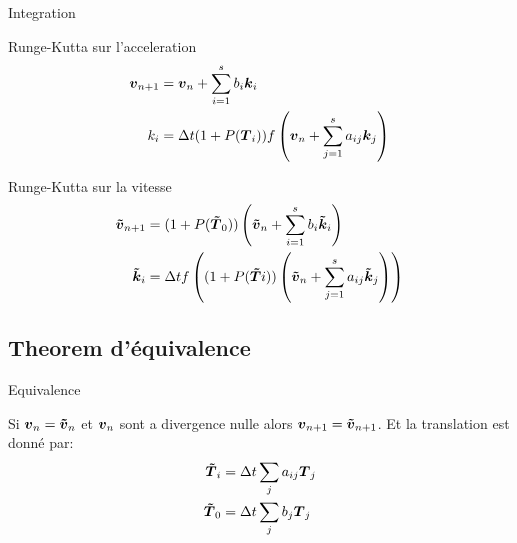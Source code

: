 \begin{frame}{Integration}
 \begin{block}{Runge-Kutta sur l'acceleration}
   \begin{align*}
	{\boldsymbol {v}}_{n+1}&={\boldsymbol {v}}_{n}+\sum_{i=1}^{s}b_{i}{\boldsymbol {k}}_{i}\\
	k_{i}&=\Delta t (1+P({\boldsymbol {T}}_{i}))f\left({\boldsymbol {v}}_{n}+\sum_{j=1}^{s}a_{ij}{\boldsymbol {k}}_{j}\right)
\end{align*}
 \end{block}
 
  \begin{block}{Runge-Kutta sur la vitesse}
   \begin{align*}
{\boldsymbol {\tilde{v}}}_{n+1}&=(1+P({\boldsymbol {\tilde{T}}}_0))\left({\boldsymbol {\tilde{v}}}_{n}+\sum_{i=1}^{s}b_{i}{\boldsymbol {\tilde{k}}}_{i}\right)\\
{\boldsymbol {\tilde{k}}}_{i}&=\Delta t f\left((1+P({\boldsymbol {\tilde{T}}}{i}))\left({\boldsymbol {\tilde{v}}}_{n}+\sum_{j=1}^{s}a_{ij}{\boldsymbol {\tilde{k}}}_{j}\right)\right)
\end{align*}
 \end{block}
\end{frame}
\subsection{Theorem d'équivalence}
\begin{frame}{Equivalence}
 \begin{theorem}
Si ${\boldsymbol {v}}_{n}={\boldsymbol {\tilde{v}}}_{n}$ et ${\boldsymbol {v}}_n$ sont a divergence nulle alors ${\boldsymbol {v}}_{n+1}={\boldsymbol {\tilde{v}}}_{n+1}$.
Et la translation est donné par:
\begin{align*}
  {\boldsymbol {\tilde{T}}}_{i}&=\Delta t\sum_{j}a_{ij}{\boldsymbol {T}}_{j}\\
  {\boldsymbol {\tilde{T}}}_{0}&=\Delta t\sum_{j}b_{j}{\boldsymbol {T}}_{j}
\end{align*}
 \end{theorem}
\end{frame}

